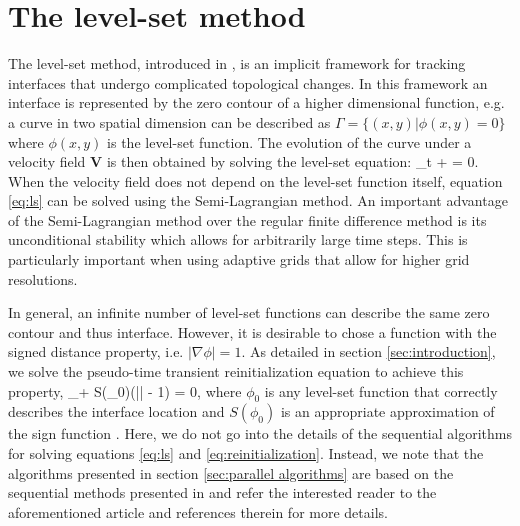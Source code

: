 \section{The level-set method}\label{sec:levelset method}
The level-set method, introduced in \cite{Osher;Sethian:88:Fronts-Propagating-w}, is an implicit framework for tracking interfaces that undergo complicated topological changes. In this framework an interface is represented by the zero contour of a higher dimensional function, e.g. a curve in two spatial dimension can be described as $\Gamma = \{(x,y) | \phi(x,y) = 0\}$ where $\phi(x,y)$ is the level-set function. The evolution of the curve under a velocity field $\mathbf{V}$ is then obtained by solving the level-set equation:
\be
\phi_t +  \cdot \nabla \phi = 0.
\label{eq:ls}
\ee
When the velocity field does not depend on the level-set function itself, equation \eqref{eq:ls} can be solved using the Semi-Lagrangian method. An important advantage of the Semi-Lagrangian method over the regular finite difference method is its unconditional stability which allows for arbitrarily large time steps. This is particularly important when using adaptive grids that allow for higher grid resolutions.

In general, an infinite number of level-set functions can describe the same zero contour and thus interface. However, it is desirable to chose a function with the signed distance property, i.e. $|\nabla \phi| = 1$. As detailed in section \ref{sec:introduction}, we solve the pseudo-time transient reinitialization equation \cite{Sussman;Smereka;Osher:94:A-Level-Set-Approach, Osher;Fedkiw:01:Level-Set-Methods:-A} to achieve this property,
\be
\phi_\tau + S(\phi_0)\left(|\nabla \phi| - 1\right) = 0,
\label{eq:reinitialization}
\ee
where $\phi_0$ is any level-set function that correctly describes the interface location and $S(\phi_0)$ is an appropriate approximation of the sign function \cite{Osher;Fedkiw:02:Level-Set-Methods-an}. Here, we do not go into the details of the sequential algorithms for solving equations \eqref{eq:ls} and \eqref{eq:reinitialization}. Instead, we note that the algorithms presented in section \ref{sec:parallel algorithms} are based on the sequential methods presented in \cite{Min;Gibou:07:A-second-order-accur} and refer the interested reader to the aforementioned article and references therein for more details.



